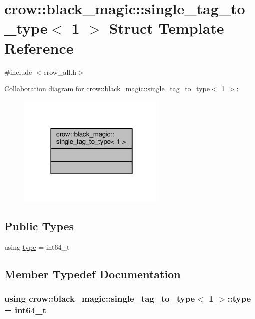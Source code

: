 \hypertarget{structcrow_1_1black__magic_1_1single__tag__to__type_3_011_01_4}{\section{crow\-:\-:black\-\_\-magic\-:\-:single\-\_\-tag\-\_\-to\-\_\-type$<$ 1 $>$ Struct Template Reference}
\label{structcrow_1_1black__magic_1_1single__tag__to__type_3_011_01_4}
}


{\ttfamily \#include $<$crow\-\_\-all.\-h$>$}



Collaboration diagram for crow\-:\-:black\-\_\-magic\-:\-:single\-\_\-tag\-\_\-to\-\_\-type$<$ 1 $>$\-:
\nopagebreak
\begin{figure}[H]
\begin{center}
\leavevmode
\includegraphics[width=202pt]{structcrow_1_1black__magic_1_1single__tag__to__type_3_011_01_4__coll__graph}
\end{center}
\end{figure}
\subsection*{Public Types}
\begin{DoxyCompactItemize}
\item 
using \hyperlink{structcrow_1_1black__magic_1_1single__tag__to__type_3_011_01_4_aff392b524bfdf238c1924f7e9c95c0cd}{type} = int64\-\_\-t
\end{DoxyCompactItemize}


\subsection{Member Typedef Documentation}
\hypertarget{structcrow_1_1black__magic_1_1single__tag__to__type_3_011_01_4_aff392b524bfdf238c1924f7e9c95c0cd}{
\subsubsection[{type}]{\setlength{\rightskip}{0pt plus 5cm}using {\bf crow\-::black\-\_\-magic\-::single\-\_\-tag\-\_\-to\-\_\-type}$<$ 1 $>$\-::{\bf type} =  int64\-\_\-t}}\label{structcrow_1_1black__magic_1_1single__tag__to__type_3_011_01_4_aff392b524bfdf238c1924f7e9c95c0cd}


